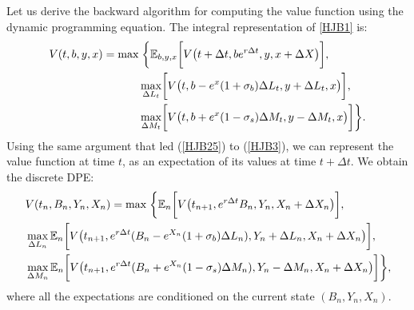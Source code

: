 Let us derive the backward algorithm for computing the value function using the dynamic programming equation. The integral representation of \ref{HJB1} is:
\begin{align}\label{HJB4}
 V(t,b,y,x) = \max & \; \biggl\{ \mathbb{E}_{b,y,x} 
 \biggl[ V \bigl( t+\Delta t, b e^{r \Delta t}, y, x + \Delta X \bigr) \biggr], \\ \nonumber
 & \max_{\Delta L_t} \biggl[ V \bigl( t,b-e^x(1+\sigma_b)\Delta L_t , y+\Delta L_t, x \bigr) \biggr] , \\ \nonumber
 & \max_{\Delta M_t} \biggl[ V \bigl( t,b+e^x(1-\sigma_s)\Delta M_t , y-\Delta M_t, x \bigr) \biggr]
 \biggr\}.
\end{align}
Using the same argument that led (\ref{HJB25}) to (\ref{HJB3}),
we can represent the value function at time $t$, as an expectation of its values at time $t+\Delta t$. 
We obtain the discrete DPE: 
\begin{align}\label{HJB5}
 & V(t_n,B_n,Y_n,X_n) = \max \; \biggl\{ \mathbb{E}_n 
 \biggl[ V \bigl( t_{n+1}, e^{r \Delta t} B_n, Y_n, X_n + \Delta X_n \bigr) \biggr], \\ \nonumber
 & \max_{\Delta L_n} 
 \mathbb{E}_n \biggl[ V \bigl( t_{n+1}, e^{r\Delta t}(B_n - e^{X_n}(1+\sigma_b)\Delta L_n) , Y_n + \Delta L_n, X_n + \Delta X_n \bigr) \biggr] , \\ \nonumber
 & \max_{\Delta M_n}
 \mathbb{E}_n \biggl[ V \bigl( t_{n+1}, e^{r\Delta t}(B_n + e^{X_n}(1-\sigma_s)\Delta M_n) , Y_n - \Delta M_n, X_n + \Delta X_n \bigr) \biggr]
 \biggr\},
\end{align}
where all the expectations are conditioned on the current state $(B_n,Y_n,X_n)$. \\

